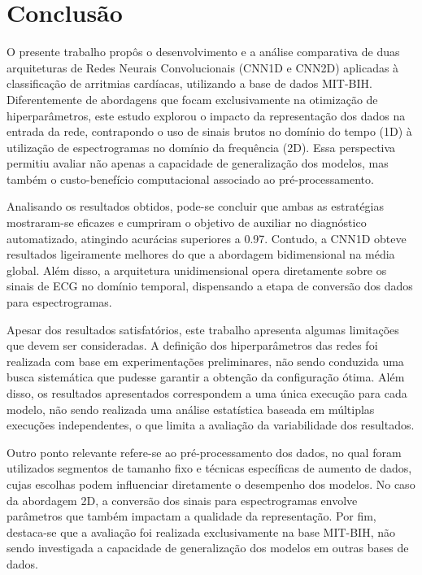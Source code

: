 \chapter[Conclusão]{Conclusão}

O presente trabalho propôs o desenvolvimento e a análise comparativa de duas arquiteturas de Redes Neurais Convolucionais (CNN1D e CNN2D) aplicadas à 
classificação de arritmias cardíacas, utilizando a base de dados MIT-BIH. Diferentemente de abordagens que focam exclusivamente na otimização de 
hiperparâmetros, este estudo explorou o impacto da representação dos dados na entrada da rede, contrapondo o uso de sinais brutos no domínio do 
tempo (1D) à utilização de espectrogramas no domínio da frequência (2D). Essa perspectiva permitiu avaliar não apenas a capacidade de generalização 
dos modelos, mas também o custo-benefício computacional associado ao pré-processamento.

Analisando os resultados obtidos, pode-se concluir que ambas as estratégias mostraram-se eficazes e cumpriram o objetivo de auxiliar no diagnóstico 
automatizado, atingindo acurácias superiores a 0.97. Contudo, a CNN1D obteve resultados ligeiramente melhores do que a abordagem bidimensional na média 
global. Além disso, a arquitetura unidimensional opera diretamente sobre os sinais de ECG no domínio temporal, dispensando a etapa de conversão 
dos dados para espectrogramas.

Apesar dos resultados satisfatórios, este trabalho apresenta algumas limitações que devem ser consideradas. A definição dos hiperparâmetros das redes 
foi realizada com base em experimentações preliminares, não sendo conduzida uma busca sistemática que pudesse garantir a obtenção da configuração ótima. 
Além disso, os resultados apresentados correspondem a uma única execução para cada modelo, não sendo realizada uma análise estatística baseada em 
múltiplas execuções independentes, o que limita a avaliação da variabilidade dos resultados. 

Outro ponto relevante refere-se ao pré-processamento dos dados, no qual foram utilizados segmentos de tamanho fixo e técnicas específicas de aumento de 
dados, cujas escolhas podem influenciar diretamente o desempenho dos modelos. No caso da abordagem 2D, a conversão dos sinais para espectrogramas envolve 
parâmetros que também impactam a qualidade da representação. Por fim, destaca-se que a avaliação foi realizada exclusivamente na base MIT-BIH, não sendo 
investigada a capacidade de generalização dos modelos em outras bases de dados.

